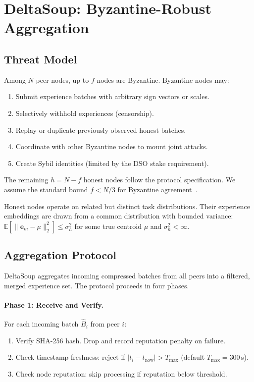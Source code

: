 \section{DeltaSoup: Byzantine-Robust Aggregation}

\label{sec:deltasoup}

\subsection{Threat Model}

\begin{assumption}
\label{ass:threat}
Among $N$ peer nodes, up to $f$ nodes are Byzantine. Byzantine nodes may:
\begin{enumerate}[leftmargin=1.5em]
    \item Submit experience batches with arbitrary sign vectors or scales.
    \item Selectively withhold experiences (censorship).
    \item Replay or duplicate previously observed honest batches.
    \item Coordinate with other Byzantine nodes to mount joint attacks.
    \item Create Sybil identities (limited by the DSO stake requirement).
\end{enumerate}
The remaining $h = N - f$ honest nodes follow the protocol specification.
We assume the standard bound $f < N/3$ for Byzantine agreement~\cite{pease1980reaching}.
\end{assumption}

\begin{assumption}
\label{ass:diversity}
Honest nodes operate on related but distinct task distributions. Their
experience embeddings are drawn from a common distribution with bounded
variance: $\mathbb{E}[\|\bm{e}_m - \mu\|_2^2] \leq \sigma_h^2$ for some
true centroid $\mu$ and $\sigma_h^2 < \infty$.
\end{assumption}

\subsection{Aggregation Protocol}

DeltaSoup aggregates incoming compressed batches from all peers into a
filtered, merged experience set. The protocol proceeds in four phases.

\paragraph{Phase 1: Receive and Verify.}
For each incoming batch $\hat{B}_i$ from peer $i$:
\begin{enumerate}[leftmargin=1.5em]
    \item Verify SHA-256 hash. Drop and record reputation penalty on failure.
    \item Check timestamp freshness: reject if $|t_i - t_{\text{now}}| > T_{\max}$
          (default $T_{\max} = 300$\,s).
    \item Check node reputation: skip processing if reputation below threshold.
\end{enumerate}

